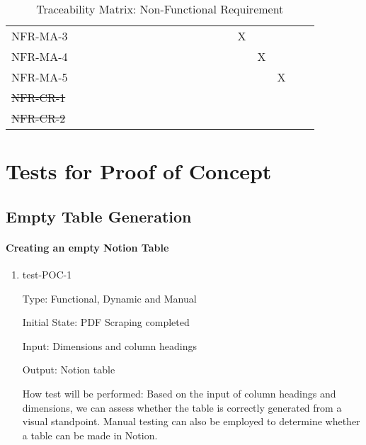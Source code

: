 \documentclass[12pt, titlepage]{article}
\begin{document}
\begin{table}[h!]
{\begin{tabular}{lccccccccccccccccccc}
\multicolumn{1}{l|}{NFR-MA-3} &  &  &  &  &  &  &  &  &  &  &  &  &  &  & X &  &  &  &  \\
\multicolumn{1}{l|}{NFR-MA-4} &  &  &  &  &  &  &  &  &  &  &  &  &  &  &  & X &  &  &  \\
\multicolumn{1}{l|}{NFR-MA-5} &  &  &  &  &  &  &  &  &  &  &  &  &  &  &  &  & X &  &  \\
\multicolumn{1}{l|}{\sout{NFR-CR-1}} &  &  &  &  &  &  &  &  &  &  &  &  &  &  &  &  &  &  &  \\
\multicolumn{1}{l|}{\sout{NFR-CR-2}} &  &  &  &  &  &  &  &  &  &  &  &  &  &  &  &  &  &  & 
\end{tabular}
}
\caption{Traceability Matrix: Non-Functional Requirement}
\label{Traceability Matrix: Non-Functional Requirement}
\end{table}

\newpage

\normalsize

\section{Tests for Proof of Concept}

\subsection{Empty Table Generation}
		
\paragraph{Creating an empty Notion Table }

\begin{enumerate}

\item{test-POC-1\\}

Type: Functional, Dynamic and Manual 

Initial State: PDF Scraping completed

Input: Dimensions and column headings 

Output: Notion table

How test will be performed: Based on the input of column headings and dimensions, we can assess whether the table is correctly generated from a visual standpoint. Manual testing can also be employed to determine whether a table can be made in Notion. 

\end{enumerate}
\end{document}
